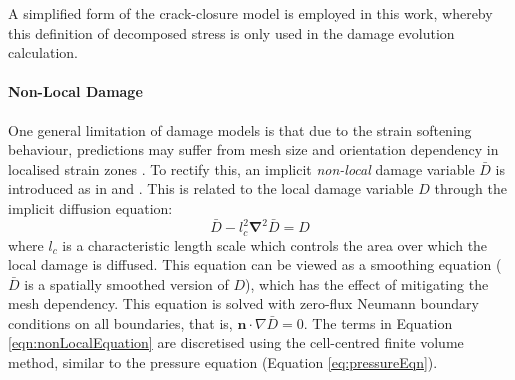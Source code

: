 \documentclass[sn-mathphys,Numbered]{sn-jnl}%
\newcommand{\bb}{\boldsymbol}
\begin{document}
A simplified form of the crack-closure model \cite{teixeira_ductile_2010} is employed in this work, whereby this definition of decomposed stress is only used in the damage evolution calculation. 






\paragraph{Non-Local Damage}


One general limitation of damage models is that due to the strain softening behaviour, predictions may suffer from mesh size and orientation dependency in localised strain zones \cite{peerlings_critical_2001, peerlings_localisation_2002, geers_strongly_2003}.
To rectify this, an implicit \emph{non-local} damage variable $\bar{D}$ is introduced as in \citet{peerlings_critical_2001, peerlings_localisation_2002} and \citet{geers_strongly_2003}.
This is related to the local damage variable $D$ through the implicit diffusion equation:
\begin{equation} \label{eqn:nonLocalEquation}
	\bar{D} -  l_c^2 \bb{\nabla}^2 \bar{D} = D
\end{equation}
where $l_c$ is a characteristic length scale which controls the area over which the local damage is diffused.
This equation can be viewed as a smoothing equation ($\bar{D}$ is a spatially smoothed version of $D$), which has the effect of mitigating the mesh dependency. This equation is solved with zero-flux Neumann boundary conditions on all boundaries, that is,  $\bb{n} \cdot \nabla \bar{D} = 0$.
The terms in Equation \ref{eqn:nonLocalEquation} are discretised using the cell-centred finite volume method, similar to the pressure equation (Equation \ref{eq:pressureEqn}).
\end{document}
